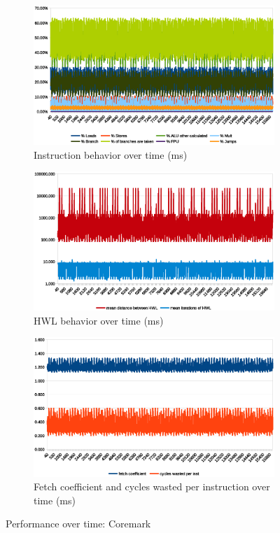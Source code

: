 \documentclass[../bachelor_paper.tex]{subfiles}
\begin{document}
\begin{figure}
    \begin{subfigure}{0.45\textwidth}
        \includegraphics[width=\textwidth]{img/graph/coremark/coremark_inst.eps}
        \caption{Instruction behavior over time (ms)}
    \end{subfigure}
    \begin{subfigure}{0.45\textwidth}
        \includegraphics[width=\textwidth]{img/graph/coremark/coremark_hwl.eps}
        \caption{\ac{HWL} behavior over time (ms)}
    \end{subfigure}
    \begin{subfigure}{0.45\textwidth}
        \includegraphics[width=\textwidth]{img/graph/coremark/coremark_fetch_waste.eps}
        \caption{Fetch coefficient and cycles wasted per instruction over time (ms)}
    \end{subfigure}
    \caption{Performance over time: Coremark}
\end{figure}

\isstandalone



\fi
\end{document}
